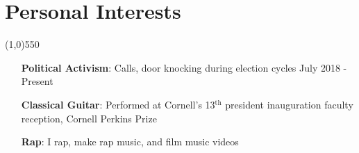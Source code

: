 \documentclass[11pt]{article} %
\begin{document}
	\section*{Personal Interests}
	\vspace{-7ex}
	\begin{center}
    \line(1,0){550}
    \end{center}
    \vspace{-2ex}
	\begin{itemize}
		\item[\textbf{Political Activism}:] Calls, door knocking during election cycles \hfill July 2018 - Present %
	\vspace{-1ex}
		\item[\textbf{Classical Guitar}:] Performed at Cornell's 13$^\textrm{th}$ president inauguration faculty reception, Cornell Perkins Prize 
	\vspace{-1ex}
		\item[\textbf{Rap}:] I rap, make rap music, and film music videos %
	\end{itemize}
	
\end{document}
